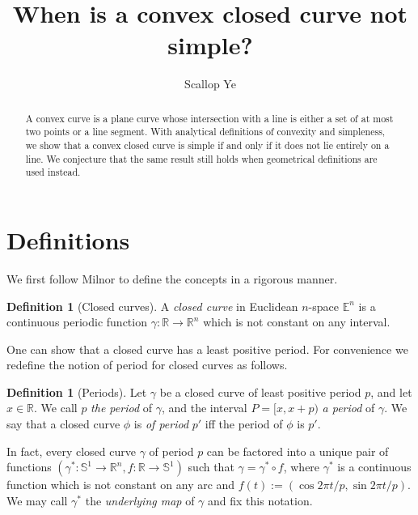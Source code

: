 \documentclass{amsart}
\title{When is a convex closed curve not simple?}
\author{Scallop Ye}
\theoremstyle{definition}
\newtheorem{definition}[proposition]{Definition}
\theoremstyle{remark}
\begin{document}
\begin{abstract}
    A convex curve is a plane curve whose intersection with a
    line is either a set of at most two points or a line segment.
    With analytical definitions of convexity and simpleness,
    we show that a convex closed curve is simple
    if and only if it does not lie entirely on a line.
    We conjecture that the same result still holds when
    geometrical definitions are used instead.
\end{abstract}

\maketitle

\section{Definitions}

We first follow Milnor \cite{milnor} to define the concepts in a rigorous manner.

\begin{definition}[Closed curves]
    \label{def:closed_curves}
    A \emph{closed curve} in Euclidean $n$-space $\mathbb{E}^n$ is a
    continuous periodic function $\gamma:\mathbb{R}\to\mathbb{R}^n$
    which is not constant on any interval.
\end{definition}

One can show that a closed curve has a least positive period.
For convenience we redefine the notion of period for closed curves
as follows.

\begin{definition}[Periods]
    \label{def:periods}
    Let $\gamma$ be a closed curve of least positive period $p$,
    and let $x\in\mathbb{R}$. We call $p$ \emph{the period} of $\gamma$,
    and the interval $P=[x,x+p)$ \emph{a period} of $\gamma$.
    We say that a closed curve $\phi$ is \emph{of period} $p'$
    iff the period of $\phi$ is $p'$.
\end{definition}

In fact, every closed curve $\gamma$ of period $p$
can be factored into a unique pair of functions
$(\gamma^*:\mathbb{S}^1\to\mathbb{R}^n,f:\mathbb{R}\to\mathbb{S}^1)$
such that $\gamma=\gamma^*\circ f$,
where $\gamma^*$ is a continuous function which is not constant
on any arc and $f(t):=(\cos 2\pi t/p,\sin 2\pi t/p)$.
We may call $\gamma^*$ the \emph{underlying map} of $\gamma$
and fix this notation.
\end{document}
